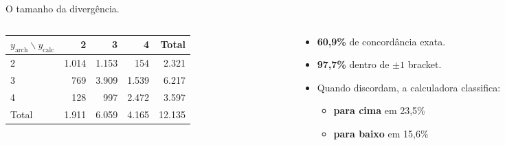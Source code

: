\documentclass[aspectratio=149, dvipsnames]{beamer}
\begin{document}
\begin{frame}{O tamanho da divergência.}
    \begin{columns}[c]
        \begin{column}{.52\textwidth}
            \begin{center}\footnotesize
            \setlength{\tabcolsep}{4pt}
            \begin{tabular}{lrrr|r}
            \toprule
            $y_{\text{arch}} \backslash y_{\text{calc}}$ & 2 & 3 & 4 & Total \\
            \midrule
            2 & 1.014 & 1.153 & 154 & 2.321 \\
            3 & 769 & 3.909 & 1.539 & 6.217 \\
            4 & 128 & 997 & 2.472 & 3.597 \\
            \midrule
            Total & 1.911 & 6.059 & 4.165 & 12.135 \\
            \bottomrule
            \end{tabular}
            \end{center}
        \end{column}%
        \hspace{0.2cm}%
        \begin{column}{.42\textwidth}
            \small
            \begin{itemize}
                \item \textbf{60,9\%} de concordância exata.
                \item \textbf{97,7\%} dentro de $\pm 1$ bracket.
                \item Quando discordam, a calculadora classifica:
                \begin{itemize}\footnotesize
                    \item \textbf{para cima} em 23,5\%
                    \item \textbf{para baixo} em 15,6\%
                \end{itemize}
            \end{itemize}
        \end{column}
    \end{columns}
\end{frame}
\end{document}
